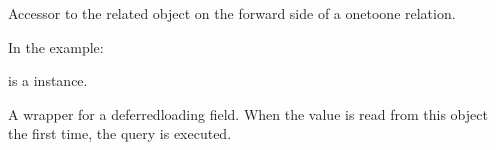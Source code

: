 \documentclass[letterpaper,10pt,english]{sphinxmanual}
\begin{document}
\begin{fulllineitems}
\begin{fulllineitems}
\end{fulllineitems}


\begin{fulllineitems}
\label{\detokenize{users:users.models.UserProfile.user}}
\sphinxAtStartPar
Accessor to the related object on the forward side of a one\sphinxhyphen{}to\sphinxhyphen{}one relation.

\sphinxAtStartPar
In the example:

\begin{sphinxVerbatim}[commandchars=\\\{\}]
 
       
\end{sphinxVerbatim}

\sphinxAtStartPar
{} is a  instance.

\end{fulllineitems}


\begin{fulllineitems}
\label{\detokenize{users:users.models.UserProfile.user_id}}
\end{fulllineitems}


\begin{fulllineitems}
\label{\detokenize{users:users.models.UserProfile.user_name}}
\sphinxAtStartPar
A wrapper for a deferred\sphinxhyphen{}loading field. When the value is read from this
object the first time, the query is executed.

\end{fulllineitems}


\end{fulllineitems}
\end{document}
